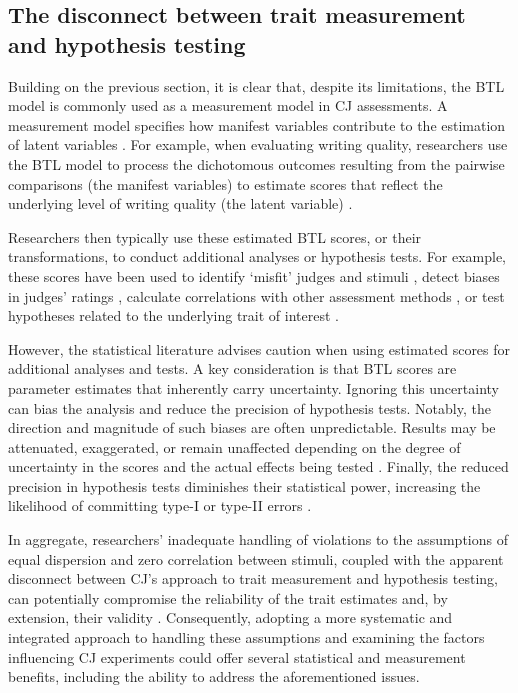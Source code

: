 \documentclass[
  authoryear,
  review,
  1p]{elsarticle}
\begin{document}
\subsection{The disconnect between trait measurement and hypothesis
testing}\label{sec-theory-issue2}

Building on the previous section, it is clear that, despite its
limitations, the BTL model is commonly used as a measurement model in CJ
assessments. A measurement model specifies how manifest variables
contribute to the estimation of latent variables
\citep{Everitt_et_al_2010}. For example, when evaluating writing
quality, researchers use the BTL model to process the dichotomous
outcomes resulting from the pairwise comparisons (the manifest
variables) to estimate scores that reflect the underlying level of
writing quality (the latent variable)
\citep{Laming_2004, Pollitt_2012b, Whitehouse_2012, vanDaal_et_al_2016, Lesterhuis_2018_thesis, Coertjens_et_al_2017, Goossens_et_al_2018, Bouwer_et_al_2023}.

Researchers then typically use these estimated BTL scores, or their
transformations, to conduct additional analyses or hypothesis tests. For
example, these scores have been used to identify `misfit' judges and
stimuli \citep{Pollitt_2012b, vanDaal_et_al_2016, Goossens_et_al_2018},
detect biases in judges' ratings
\citep{Pollitt_et_al_2003, Pollitt_2012b}, calculate correlations with
other assessment methods \citep{Goossens_et_al_2018, Bouwer_et_al_2023},
or test hypotheses related to the underlying trait of interest
\citep{Bramley_et_al_2019, Boonen_et_al_2020, Bouwer_et_al_2023, vanDaal_et_al_2017, Jones_et_al_2019, Gijsen_et_al_2021}.

However, the statistical literature advises caution when using estimated
scores for additional analyses and tests. A key consideration is that
BTL scores are parameter estimates that inherently carry uncertainty.
Ignoring this uncertainty can bias the analysis and reduce the precision
of hypothesis tests. Notably, the direction and magnitude of such biases
are often unpredictable. Results may be attenuated, exaggerated, or
remain unaffected depending on the degree of uncertainty in the scores
and the actual effects being tested
\citetext{\citealp[pp.~25]{Kline_et_al_2023}; \citealp[pp.~137]{Hoyle_et_al_2023}}.
Finally, the reduced precision in hypothesis tests diminishes their
statistical power, increasing the likelihood of committing type-I or
type-II errors \citep{McElreath_2020}.

In aggregate, researchers' inadequate handling of violations to the
assumptions of equal dispersion and zero correlation between stimuli,
coupled with the apparent disconnect between CJ's approach to trait
measurement and hypothesis testing, can potentially compromise the
reliability of the trait estimates and, by extension, their validity
\citep[pp.~2]{Perron_et_al_2015}. Consequently, adopting a more
systematic and integrated approach to handling these assumptions and
examining the factors influencing CJ experiments could offer several
statistical and measurement benefits, including the ability to address
the aforementioned issues.
\end{document}
